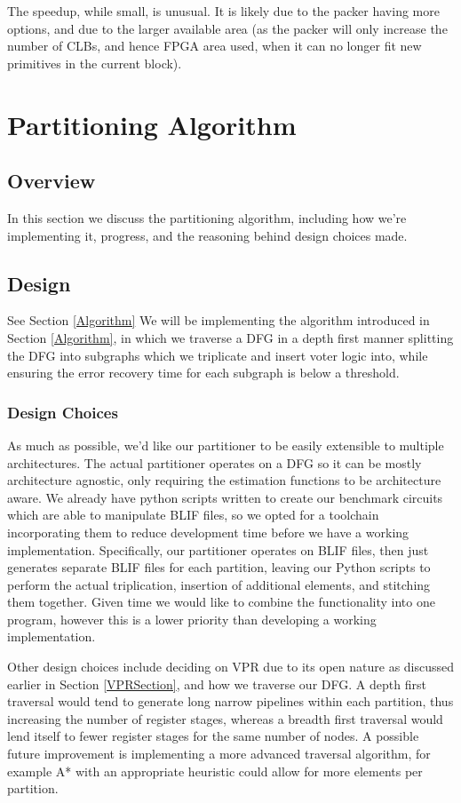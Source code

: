 \documentclass[12pt,final,oneside]{memoir} %
\begin{document}
The speedup, while small, is unusual. It is likely due to the packer having more options, and due to the larger available area (as the packer will only increase the number of \acp{CLB}, and hence \ac{FPGA} area used, when it can no longer fit new primitives in the current block).


\chapter{Partitioning Algorithm}
\section{Overview}
In this section we discuss the partitioning algorithm, including how we're implementing it, progress, and the reasoning behind design choices made.
\section{Design}
See Section \ref{Algorithm}
We will be implementing the algorithm introduced in Section \ref{Algorithm}, in which we traverse a \ac{DFG} in a depth first manner splitting the \ac{DFG} into subgraphs which we triplicate and insert voter logic into, while ensuring the error recovery time for each subgraph is below a threshold.

\subsection{Design Choices}
As much as possible, we'd like our partitioner to be easily extensible to multiple architectures. The actual partitioner operates on a \ac{DFG} so it can be mostly architecture agnostic, only requiring the estimation functions to be architecture aware.
We already have python scripts written to create our benchmark circuits which are able to manipulate \ac{BLIF} files, so we opted for a toolchain incorporating them to reduce development time before we have a working implementation. Specifically, our partitioner operates on \ac{BLIF} files, then just generates separate \ac{BLIF} files for each partition, leaving our Python scripts to perform the actual triplication, insertion of additional elements, and stitching them together. Given time we would like to combine the functionality into one program, however this is a lower priority than developing a working implementation.

Other design choices include deciding on \ac{VPR} due to its open nature as discussed earlier in Section \ref{VPRSection}, and how we traverse our \ac{DFG}. A depth first traversal would tend to generate long narrow pipelines within each partition, thus increasing the number of register stages, whereas a breadth first traversal would lend itself to fewer register stages for the same number of nodes. A possible future improvement is implementing a more advanced traversal algorithm, for example A* with an appropriate heuristic could allow for more elements per partition.
\end{document}
